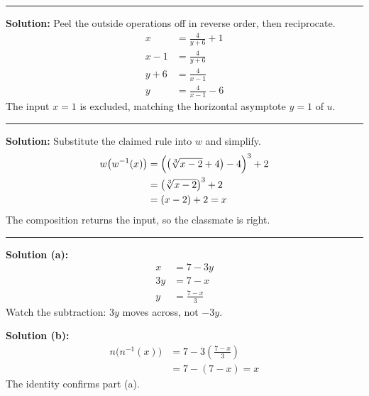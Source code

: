 \documentclass[12pt]{article}
\begin{document}
\vspace{0.2cm}\noindent\rule{\linewidth}{0.2pt}


\textbf{Solution:} Peel the outside operations off in reverse order, then reciprocate.
\begin{align*}
  x &= \frac{4}{y + 6} + 1 \\
  x - 1 &= \frac{4}{y + 6} \\
  y + 6 &= \frac{4}{x - 1} \\
  y &= \frac{4}{x - 1} - 6
\end{align*}
The input $x = 1$ is excluded, matching the horizontal asymptote $y = 1$ of $u$. 

\vspace{0.2cm}\noindent\rule{\linewidth}{0.2pt}


\textbf{Solution:} Substitute the claimed rule into $w$ and simplify.
\begin{align*}
  w\bigl(w^{-1}(x)\bigr) &= \Bigl(\bigl(\sqrt[3]{x - 2} + 4\bigr) - 4\Bigr)^3 + 2 \\
                         &= \bigl(\sqrt[3]{x - 2}\bigr)^3 + 2 \\
                         &= (x - 2) + 2 = x
\end{align*}
The composition returns the input, so the classmate is right. 

\vspace{0.2cm}\noindent\rule{\linewidth}{0.2pt}


\textbf{Solution (a):}
\begin{align*}
  x &= 7 - 3y \\
  3y &= 7 - x \\
  y &= \frac{7 - x}{3}
\end{align*}
Watch the subtraction: $3y$ moves across, not $-3y$. 

\textbf{Solution (b):}
\begin{align*}
  n\bigl(n^{-1}(x)\bigr) &= 7 - 3\left(\frac{7 - x}{3}\right) \\
                         &= 7 - (7 - x) = x
\end{align*}
The identity confirms part (a). 
\end{document}
